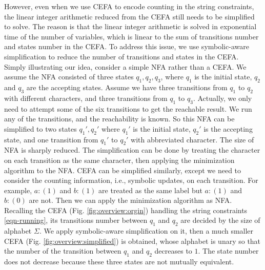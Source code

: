 However, even when we use CEFA to encode counting in the string constraints, the linear integer arithmetic reduced from the CEFA still needs to be simplified to solve. The reason is that the linear integer arithmetic is solved in exponential time of the number of variables, which is linear to the sum of transitions number and states number in the CEFA. To address this issue, we use symbolic-aware simplification to reduce the number of transitions and states in the CEFA. Simply illustrating our idea, consider a simple NFA rather than a CEFA. We assume the NFA consisted of three states $q_1, q_2, q_3$, where $q_1$ is the initial state, $q_2$ and $q_3$ are the accepting states. Assume we have three transitions from $q_1$ to $q_2$ with different characters, and three transitions from $q_1$ to $q_3$. Actually, we only need to attempt some of the six transitions to get the reachable result. We run any of the transitions, and the reachability is known. So this NFA can be simplified to two states $q_1', q_2'$ where $q_1'$ is the initial state, $q_2'$ is the accepting state, and one transition from $q_1'$ to $q_2'$ with abbreviated character. The size of NFA is sharply reduced. The simplification can be done by treating the character on each transition as the same character, then applying the minimization algorithm to the NFA. CEFA can be simplified similarly, except we need to consider the counting information, i.e., symbolic updates, on each transition. For example, $a:(1)$ and $b:(1)$ are treated as the same label but $a:(1)$ and $b:(0)$ are not. Then we can apply the minimization algorithm as NFA. Recalling the CEFA (Fig. \ref{fig:overview:orgin}) handling the string constraints \ref{eqn-running}, its transitions number between $q_1$ and $q_2$ are decided by the size of alphabet $\Sigma$. We apply symbolic-aware simplification on it, then a much smaller CEFA (Fig. \ref{fig:overview:simplified}) is obtained, whose alphabet is unary so that the number of the transition between $q_1$ and $q_2$ decreases to $1$. The state number does not decrease because these three states are not mutually equivalent. 

